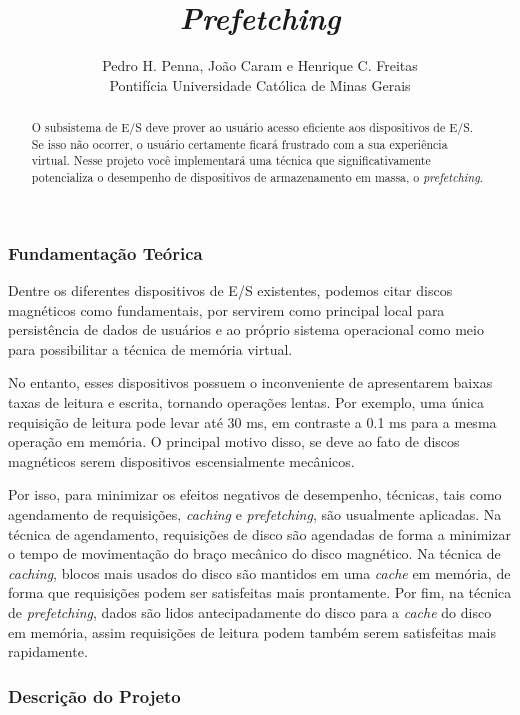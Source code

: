 \documentclass[11pt]{article}
\title{\textit{Prefetching}}
\author{Pedro H. Penna, João Caram e Henrique C. Freitas\\[0.3em]
\small Pontifícia Universidade Católica de Minas Gerais}
\date{}
\begin{document}
\maketitle

\begin{abstract}

\noindent O subsistema de E/S deve prover ao usuário acesso eficiente aos dispositivos de E/S. Se isso não ocorrer, o usuário certamente ficará frustrado com a sua experiência virtual. Nesse projeto você implementará uma técnica que significativamente potencializa o desempenho de dispositivos de armazenamento em massa, o \textit{prefetching}.

\end{abstract}

\subsubsection*{Fundamentação Teórica}

Dentre os diferentes dispositivos de E/S existentes, podemos citar discos magnéticos como fundamentais, por servirem como principal local para persistência de dados de usuários e ao próprio sistema operacional como meio para possibilitar a técnica de memória virtual.

No entanto, esses dispositivos possuem o inconveniente de apresentarem baixas taxas de leitura e escrita, tornando operações lentas. Por exemplo, uma única requisição de leitura pode levar até 30 ms, em contraste a 0.1 ms para a mesma operação em memória. O principal motivo disso, se deve ao fato de discos magnéticos serem dispositivos escensialmente mecânicos.

Por isso, para minimizar os efeitos negativos de desempenho, técnicas, tais como agendamento de requisições, \textit{caching} e \textit{prefetching}, são usualmente aplicadas. Na técnica de agendamento, requisições de disco são agendadas de forma a minimizar o tempo de movimentação do braço mecânico do disco magnético. Na técnica de \textit{caching}, blocos mais usados do disco são mantidos em uma \textit{cache} em memória, de forma que requisições podem ser satisfeitas mais prontamente. Por fim, na técnica de \textit{prefetching}, dados são lidos antecipadamente do disco para a \textit{cache} do disco em memória, assim requisições de leitura podem também serem satisfeitas mais rapidamente.

\subsubsection*{Descrição do Projeto}
\end{document}
